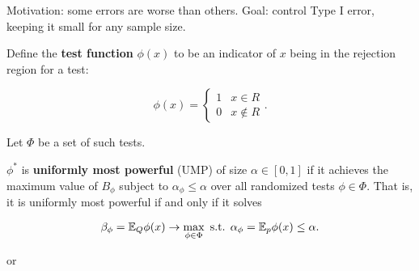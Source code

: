 Motivation: some errors are worse than others. Goal: control Type I error, keeping it small for any sample size. 

Define the \textbf{test function} \(\phi(x)\) to be an indicator of \(x\) being in the rejection region for a test:

\[
\phi(x) = \begin{cases}
1 & x \in R \\
0 & x \notin R
\end{cases}.
\]

Let \(\Phi\) be a set of such tests.

\begin{definition}

\(\phi^*\) is \textbf{uniformly most powerful} (UMP) of size \(\alpha \in [0,1]\) if it achieves the maximum value of \(B_\phi\) subject to \(\alpha_\phi \leq \alpha\) over all randomized tests \(\phi \in \Phi\). That is, it is uniformly most powerful if and only if it solves

\[
\beta_\phi = \E_Q \phi(x) \to \max_{\phi \in \Phi} \text{ s.t. } \alpha_\phi = \E_p \phi(x) \leq \alpha.
\]

or


\end{definition}



